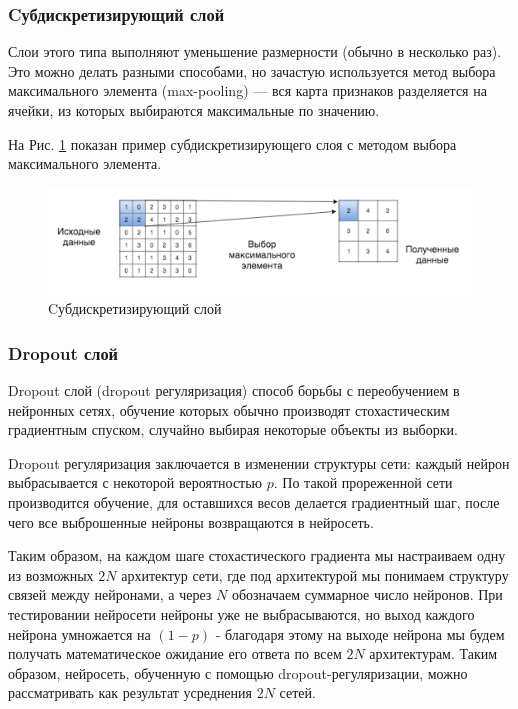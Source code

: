 \subsubsection{Cубдискретизирующий слой} \label{pooling_rev}
Слои этого типа выполняют уменьшение размерности (обычно в несколько раз). Это можно делать разными способами, но зачастую используется метод выбора максимального элемента (max-pooling) — вся карта признаков разделяется на ячейки, из которых выбираются максимальные по значению.

На Рис. \ref{fig:pooling_layer} показан пример субдискретизирующего слоя с методом выбора максимального элемента.
\begin{figure}[ht]
    \centering
    \includegraphics [width=\textwidth*2/3] {images/pooling_layer.png}
    \caption{Cубдискретизирующий слой}
    \label{fig:pooling_layer}
\end{figure}

\subsubsection{Dropout слой} \label{dropout_rev}
Dropout слой (dropout регуляризация)\cite{dropout} способ борьбы с переобучением в нейронных сетях, обучение которых обычно производят стохастическим градиентным спуском, случайно выбирая некоторые объекты из выборки. 

Dropout регуляризация заключается в изменении структуры сети: каждый нейрон выбрасывается с некоторой вероятностью $p$. По такой прореженной сети производится обучение, для оставшихся весов делается градиентный шаг, после чего все выброшенные нейроны возвращаются в нейросеть.

Таким образом, на каждом шаге стохастического градиента мы настраиваем одну из возможных $2N$ архитектур сети, где под архитектурой мы понимаем структуру связей между нейронами, а через $N$ обозначаем суммарное число нейронов. При тестировании нейросети нейроны уже не выбрасываются, но выход каждого нейрона умножается на $(1 - p)$ - благодаря этому на выходе нейрона мы будем получать математическое ожидание его ответа по всем $2N$ архитектурам. Таким образом, нейросеть, обученную с помощью dropout-регуляризации, можно рассматривать как результат усреднения $2N$ сетей.

